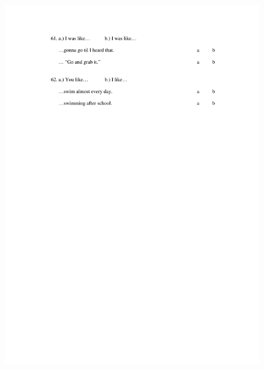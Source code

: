 \begin{figure}[htbp]
	\centering
		\includegraphics[width=5in]{images/Exp1page10.pdf}
		\label{x1p10}
\end{figure}


